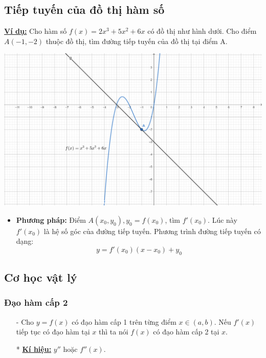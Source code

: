 \documentclass{article}
\begin{document}
\begin{Large}
		\subsection{Tiếp tuyến của đồ thị hàm số}
		\textbf{\underline{Ví dụ:}} Cho hàm số $f(x)=2x^3+5x^2+6x$ có đồ thị như hình dưới. Cho điểm $A(-1,-2)$ thuộc đồ thị, tìm đường tiếp tuyến của đồ thị tại điểm A.\\
\begin{center}
	\includegraphics[scale=0.6]{"đồ thị"}
\end{center}
		\begin{itemize}
			\item \textbf{Phương pháp:} Điểm $A(x_0,y_0), y_0=f(x_0)$, tìm $f'(x_0)$. Lúc này $f'(x_0)$ là hệ số góc của đường tiếp tuyến. Phương trình đường tiếp tuyến có dạng: $$y=f'(x_0)(x-x_0)+y_0$$
		\end{itemize}
		\subsection{Cơ học vật lý}
		\subsubsection{Đạo hàm cấp 2}
		\begin{itemize}
			\item [-]Cho $y=f(x)$ có đạo hàm cấp 1 trên từng điểm $x\in(a,b)$. Nếu $f'(x)$ tiếp tục có đạo hàm tại $x$ thì ta nói $f(x)$ có đạo hàm cấp 2 tại $x$.
			\item [*] \textbf{\underline{Kí hiệu:}} $y''$ hoặc $f''(x)$.
		\end{itemize}

\end{Large}
\end{document}
